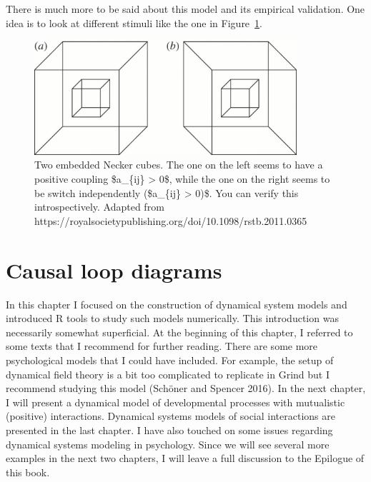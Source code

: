 \documentclass[
  letterpaper,
]{scrbook}
\begin{document}
There is much more to be said about this model and its empirical
validation. One idea is to look at different stimuli like the one in
Figure~\ref{fig-ch5-img20-old-68}.

\begin{figure}

{\centering \includegraphics[width=3.82602in,height=\textheight]{media/ch5/image20.jpg}

}

\caption{\label{fig-ch5-img20-old-68}Two embedded Necker cubes. The one
on the left seems to have a positive coupling \$a\_\{ij\} \textgreater{}
0\$, while the one on the right seems to be switch independently
(\$a\_\{ij\} \textgreater{} 0)\$. You can verify this introspectively.
Adapted from
https://royalsocietypublishing.org/doi/10.1098/rstb.2011.0365}

\end{figure}

\hypertarget{causal-loop-diagrams}{%
\section{Causal loop diagrams}\label{causal-loop-diagrams}}

In this chapter I focused on the construction of dynamical system models
and introduced R tools to study such models numerically. This
introduction was necessarily somewhat superficial. At the beginning of
this chapter, I referred to some texts that I recommend for further
reading. There are some more psychological models that I could have
included. For example, the setup of dynamical field theory is a bit too
complicated to replicate in Grind but I recommend studying this model
(Schöner and Spencer 2016). In the next chapter, I will present a
dynamical model of developmental processes with mutualistic (positive)
interactions. Dynamical systems models of social interactions are
presented in the last chapter. I have also touched on some issues
regarding dynamical systems modeling in psychology. Since we will see
several more examples in the next two chapters, I will leave a full
discussion to the Epilogue of this book.
\end{document}
